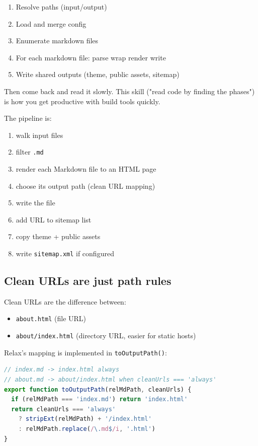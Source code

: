 \begin{enumerate}
  \item Resolve paths (input/output)
  \item Load and merge config
  \item Enumerate markdown files
  \item For each markdown file: parse \textrightarrow wrap \textrightarrow render \textrightarrow write
  \item Write shared outputs (theme, public assets, sitemap)
\end{enumerate}

Then come back and read it slowly.
This skill ("read code by finding the phases") is how you get productive with build tools quickly.

The pipeline is:

\begin{enumerate}
  \item walk input files
  \item filter \texttt{.md}
  \item render each Markdown file to an HTML page
  \item choose its output path (clean URL mapping)
  \item write the file
  \item add URL to sitemap list
  \item copy theme + public assets
  \item write \texttt{sitemap.xml} if configured
\end{enumerate}

\subsection{Clean URLs are just path rules}
Clean URLs are the difference between:

\begin{itemize}
  \item \texttt{about.html} (file URL)
  \item \texttt{about/index.html} (directory URL, easier for static hosts)
\end{itemize}

Relax's mapping is implemented in \texttt{toOutputPath()}:

\begin{lstlisting}[style=relax,language=JavaScript,caption={Clean URL mapping (from \texttt{src/ssg/site.ts}).}]
// index.md -> index.html always
// about.md -> about/index.html when cleanUrls === 'always'
export function toOutputPath(relMdPath, cleanUrls) {
  if (relMdPath === 'index.md') return 'index.html'
  return cleanUrls === 'always'
    ? stripExt(relMdPath) + '/index.html'
    : relMdPath.replace(/\.md$/i, '.html')
}
\end{lstlisting}

